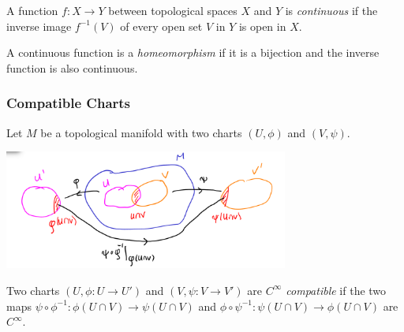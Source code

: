\begin{frame}
  \begin{defn}
    A function $f \colon X \to Y$ between topological spaces
    $X$ and $Y$ is {\em continuous} if the inverse image $f^{-1}(V)$ of
    every open set $V$ in $Y$ is open in $X$.
  \end{defn}
  \begin{defn}
    A continuous function is a {\em homeomorphism} if
    it is a bijection and the inverse function is 
    also continuous.
  \end{defn}
\end{frame}
\begin{frame}
  \frametitle{Compatible Charts}
  Let $M$ be a topological manifold with two charts $(U, \phi)$ 
  and $(V, \psi)$.

  \begin{center}
    \includegraphics[width=0.7\textwidth]{figures/two_charts.png}
  \end{center}
  \begin{defn}
    Two charts $(U, \phi \colon U \to U')$ and
    $(V, \psi \colon V \to V')$ are 
    {\em $C^{\infty}$ compatible}
    if the two maps $\psi \circ \phi^{-1} \colon \phi(U \cap V) \to 
    \psi(U \cap V)$ and
    $\phi \circ \psi^{-1} \colon \psi(U \cap V) \to 
    \phi(U \cap V)$ are $C^{\infty}$.
  \end{defn}
\end{frame}

